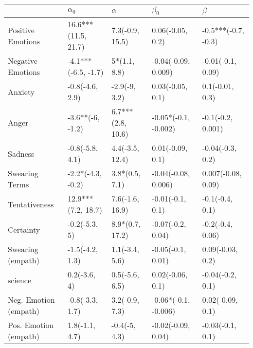 \begin{tabular}{lllll}
\toprule
{} &           $\alpha_0$ &           $\alpha$ &             $\beta_0$ &              $\beta$ \\
\midrule
Positive Emotions     &  16.6***(11.5, 21.7) &    7.3(-0.9, 15.5) &      0.06(-0.05, 0.2) &  -0.5***(-0.7, -0.3) \\
Negative Emotions     &  -4.1***(-6.5, -1.7) &       5*(1.1, 8.8) &   -0.04(-0.09, 0.009) &    -0.01(-0.1, 0.09) \\
Anxiety               &      -0.8(-4.6, 2.9) &      -2.9(-9, 3.2) &      0.03(-0.05, 0.1) &      0.1(-0.01, 0.3) \\
Anger                 &     -3.6**(-6, -1.2) &  6.7***(2.8, 10.6) &  -0.05*(-0.1, -0.002) &    -0.1(-0.2, 0.001) \\
Sadness               &      -0.8(-5.8, 4.1) &    4.4(-3.5, 12.4) &      0.01(-0.09, 0.1) &     -0.04(-0.3, 0.2) \\
Swearing Terms        &    -2.2*(-4.3, -0.2) &     3.8*(0.5, 7.1) &   -0.04(-0.08, 0.006) &   0.007(-0.08, 0.09) \\
Tentativeness         &   12.9***(7.2, 18.7) &    7.6(-1.6, 16.9) &      -0.01(-0.1, 0.1) &      -0.1(-0.4, 0.1) \\
Certainty             &        -0.2(-5.3, 5) &    8.9*(0.7, 17.2) &     -0.07(-0.2, 0.04) &     -0.2(-0.4, 0.06) \\
Swearing (empath)     &      -1.5(-4.2, 1.3) &     1.1(-3.4, 5.6) &     -0.05(-0.1, 0.01) &     0.09(-0.03, 0.2) \\
science               &         0.2(-3.6, 4) &     0.5(-5.6, 6.5) &      0.02(-0.06, 0.1) &     -0.04(-0.2, 0.1) \\
Neg. Emotion (empath) &      -0.8(-3.3, 1.7) &     3.2(-0.9, 7.3) &  -0.06*(-0.1, -0.006) &     0.02(-0.09, 0.1) \\
Pos. Emotion (empath) &       1.8(-1.1, 4.7) &      -0.4(-5, 4.3) &    -0.02(-0.09, 0.04) &     -0.03(-0.1, 0.1) \\
\bottomrule
\end{tabular}
